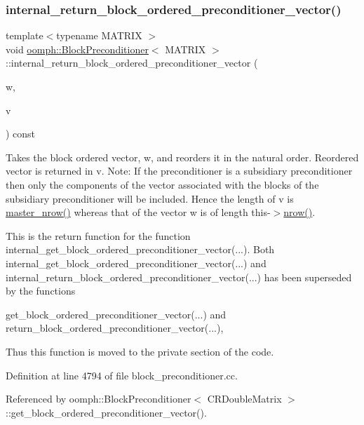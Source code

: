 \subsubsection{\texorpdfstring{internal\+\_\+return\+\_\+block\+\_\+ordered\+\_\+preconditioner\+\_\+vector()}{internal\_return\_block\_ordered\_preconditioner\_vector()}}
{\footnotesize\ttfamily template$<$typename M\+A\+T\+R\+IX $>$ \\
void \hyperlink{classoomph_1_1BlockPreconditioner}{oomph\+::\+Block\+Preconditioner}$<$ M\+A\+T\+R\+IX $>$\+::internal\+\_\+return\+\_\+block\+\_\+ordered\+\_\+preconditioner\+\_\+vector (\begin{DoxyParamCaption}\item[{const \hyperlink{classoomph_1_1DoubleVector}{Double\+Vector} \&}]{w,  }\item[{\hyperlink{classoomph_1_1DoubleVector}{Double\+Vector} \&}]{v }\end{DoxyParamCaption}) const}



Takes the block ordered vector, w, and reorders it in the natural order. Reordered vector is returned in v. Note\+: If the preconditioner is a subsidiary preconditioner then only the components of the vector associated with the blocks of the subsidiary preconditioner will be included. Hence the length of v is \hyperlink{classoomph_1_1BlockPreconditioner_a3e5b553f65e6c25354a5c908d507e8ee}{master\+\_\+nrow()} whereas that of the vector w is of length this-\/$>$\hyperlink{classoomph_1_1DistributableLinearAlgebraObject_a7569556f14fd68b28508920e89bd5eee}{nrow()}. 

This is the return function for the function internal\+\_\+get\+\_\+block\+\_\+ordered\+\_\+preconditioner\+\_\+vector(...). Both internal\+\_\+get\+\_\+block\+\_\+ordered\+\_\+preconditioner\+\_\+vector(...) and internal\+\_\+return\+\_\+block\+\_\+ordered\+\_\+preconditioner\+\_\+vector(...) has been superseded by the functions

get\+\_\+block\+\_\+ordered\+\_\+preconditioner\+\_\+vector(...) and return\+\_\+block\+\_\+ordered\+\_\+preconditioner\+\_\+vector(...),

Thus this function is moved to the private section of the code. 

Definition at line 4794 of file block\+\_\+preconditioner.\+cc.



Referenced by oomph\+::\+Block\+Preconditioner$<$ C\+R\+Double\+Matrix $>$\+::get\+\_\+block\+\_\+ordered\+\_\+preconditioner\+\_\+vector().

